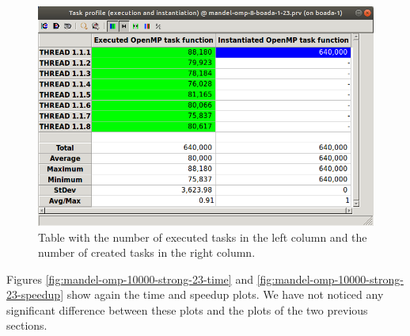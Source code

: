 \documentclass[12pt, a4paper]{article}
\begin{document}
\begin{figure}[H]
	\centering
	\includegraphics[scale=0.40]{./S2_OMP_tasks_table_23}
	\caption{Table with the number of executed tasks in the left column and the number of created tasks in the right column.}
	\label{fig:S2_OMP_tasks_table_23}
\end{figure}

Figures \ref{fig:mandel-omp-10000-strong-23-time} and \ref{fig:mandel-omp-10000-strong-23-speedup} show again the time and speedup plots. We have not noticed any significant difference between these plots and the plots of the two previous sections.
\end{document}
